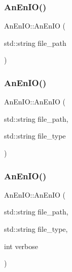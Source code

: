 \mbox{\label{class_an_en_i_o_ad4b50b97a671e5063e08aa463e393a23}} 
\subsubsection{\texorpdfstring{An\+En\+I\+O()}{AnEnIO()}\hspace{0.1cm}{\footnotesize\ttfamily [3/6]}}
{\footnotesize\ttfamily An\+En\+I\+O\+::\+An\+En\+IO (\begin{DoxyParamCaption}\item[{std\+::string}]{file\+\_\+path }\end{DoxyParamCaption})}

\mbox{\label{class_an_en_i_o_af19d6df2100a5922affa88b37a825caf}} 
\subsubsection{\texorpdfstring{An\+En\+I\+O()}{AnEnIO()}\hspace{0.1cm}{\footnotesize\ttfamily [4/6]}}
{\footnotesize\ttfamily An\+En\+I\+O\+::\+An\+En\+IO (\begin{DoxyParamCaption}\item[{std\+::string}]{file\+\_\+path,  }\item[{std\+::string}]{file\+\_\+type }\end{DoxyParamCaption})}

\mbox{\label{class_an_en_i_o_a6e33a9ad4a80aabf6c78aae3bcbbf8dd}} 
\subsubsection{\texorpdfstring{An\+En\+I\+O()}{AnEnIO()}\hspace{0.1cm}{\footnotesize\ttfamily [5/6]}}
{\footnotesize\ttfamily An\+En\+I\+O\+::\+An\+En\+IO (\begin{DoxyParamCaption}\item[{std\+::string}]{file\+\_\+path,  }\item[{std\+::string}]{file\+\_\+type,  }\item[{int}]{verbose }\end{DoxyParamCaption})}

